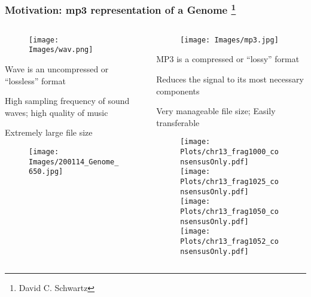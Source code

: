 \documentclass[10pt,dvipsnames,table]{beamer}
\begin{document}
\begin{frame}
\frametitle{Motivation: mp3 representation of a Genome \footnote{\tiny{David C. Schwartz}}}
\vspace{-0.5cm}
\begin{columns}[t]
\begin{column}{0.5\textwidth}
\vspace{-0.5cm}
\begin{figure}[t]
\texttt{[image: Images/wav.png]} 
\end{figure}

\vspace{-0.5cm}
\begin{itemize}
{\footnotesize{
\item Wave is an uncompressed or ``lossless'' format
\item High sampling frequency of sound waves; high quality of music
\item Extremely large file size
}}
\end{itemize}
\vspace{-0.5cm}
\begin{figure}[H]
\texttt{[image: Images/200114\_Genome\_650.jpg]} 
\end{figure}

\end{column}

\begin{column}{0.5\textwidth}
\vspace{-0.5cm}
\begin{figure}[t]
\texttt{[image: Images/mp3.jpg]}
\end{figure}

\vspace{-0.5cm}
\begin{itemize}
{\footnotesize{
\item MP3 is a compressed or ``lossy'' format
\item Reduces the signal to its most necessary components
\item Very manageable file size; Easily transferable
}}
\end{itemize}
\vspace{-0.5cm}
\begin{figure}[H]
\hspace{-1cm}
\texttt{[image: Plots/chr13\_frag1000\_consensusOnly.pdf]} \\
\vspace{-0.5cm} \hspace{0.5cm}
\texttt{[image: Plots/chr13\_frag1025\_consensusOnly.pdf]} \\
\vspace{-0.5cm} \hspace{-2cm}
\texttt{[image: Plots/chr13\_frag1050\_consensusOnly.pdf]} \\
\vspace{-0.5cm} \hspace{1cm}
\texttt{[image: Plots/chr13\_frag1052\_consensusOnly.pdf]} \\
\end{figure}


\end{column}
\end{columns}
\end{frame}
\end{document}
